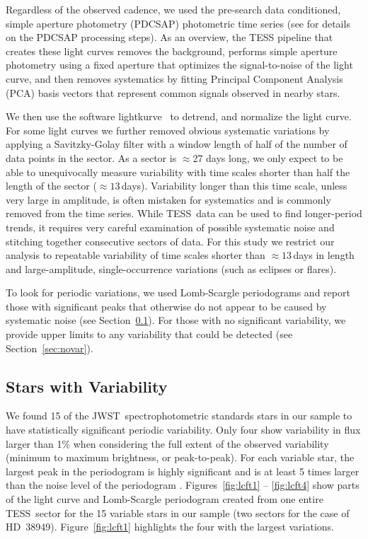 \documentclass[twocolumn]{aastex631}
\newcommand{\webb}{JWST}
\newcommand{\tess}{TESS}
\newcommand{\lightkurve}{{{\fontfamily{lmtt}\selectfont lightkurve}}}
\begin{document}
Regardless of the observed cadence, we used the pre-search data conditioned, simple aperture photometry (PDCSAP) photometric time series (see \citealt{Smith2012,Stumpe2012PASP} for details on the PDCSAP processing steps). As an overview, the TESS pipeline that creates these light curves removes the background, performs simple aperture photometry using a fixed aperture that optimizes the signal-to-noise of the light curve, and then removes systematics by fitting Principal Component Analysis (PCA) basis vectors that represent common signals observed in nearby stars. 

We then use the software \lightkurve\ \citep{lightkurve} to detrend, and normalize the light curve. For some light curves we further removed obvious systematic variations by applying a Savitzky-Golay filter \citep{savgol1964AnaCh..36.1627S} with a window length of half of the number of data points in the sector. As a sector is $\approx$27 days long, we only expect to be able to unequivocally measure variability with time scales shorter than half the length of the sector ($\approx 13$\,days).  Variability longer than this time scale, unless very large in amplitude, is often mistaken for systematics and is commonly removed from the time series. While \tess\ data can be used to find longer-period trends, it requires very careful examination of possible systematic noise and stitching together consecutive sectors of data. For this study we restrict our analysis to repeatable variability of time scales shorter than $\approx 13$\,days in length and large-amplitude, single-occurrence variations (such as eclipses or flares).

To look for periodic variations, we used Lomb-Scargle periodograms \citep{Lomb1976,lightkurve} and report those with significant peaks that otherwise do not appear to be caused by systematic noise (see Section~\ref{sec:var}).  For those with no significant variability, we provide upper limits to any variability that could be detected (see Section~\ref{sec:novar}).

\subsection{Stars with Variability}
\label{sec:var}

We found 15 of the \webb\ spectrophotometric standards stars in our sample to have statistically significant periodic variability. Only four show variability in flux larger than 1\% when considering the full extent of the observed variability (minimum to maximum brightness, or peak-to-peak).  For each variable star, the largest peak in the periodogram is highly significant and is at least 5 times larger than the noise level of the periodogram \citep{KjeldsenBedding1995, Baran2021}. Figures~\ref{fig:lcft1} -- \ref{fig:lcft4} show parts of the light curve and Lomb-Scargle periodogram created from one entire \tess\ sector for the 15 variable stars in our sample (two sectors for the case of HD~38949). 
Figure~\ref{fig:lcft1} highlights the four with the largest variations.  
\end{document}
